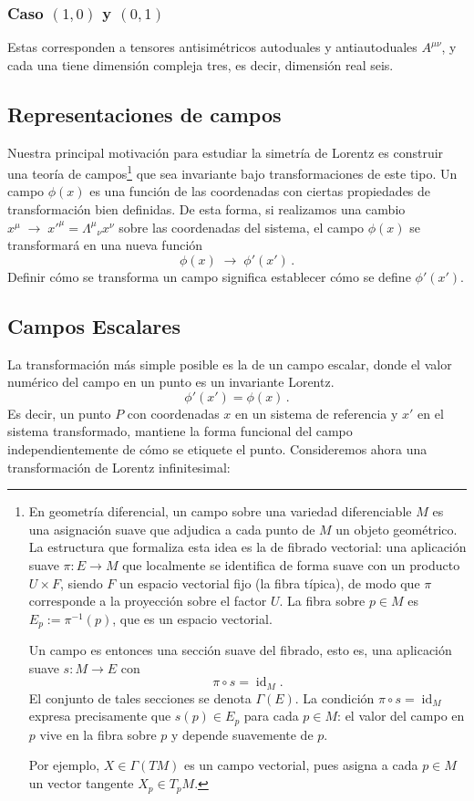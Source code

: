 \documentclass[a4paper,11pt]{book} %
\begin{document}
\subsubsection*{Caso $(1, 0)$ y $(0, 1)$}
\noindent
Estas corresponden a tensores antisimétricos
autoduales y antiautoduales $A^{\mu\nu}$, y cada una tiene dimensión compleja
tres, es decir, dimensión real seis.
\newpage
\subsection{Representaciones de campos}
\noindent
Nuestra principal motivación para estudiar la simetría de Lorentz es construir una teoría de campos\footnote{En geometría diferencial, un campo sobre una variedad
diferenciable \(M\) es una asignación suave que adjudica a cada punto de \(M\)
un objeto geométrico. La estructura que formaliza esta idea es la de
fibrado vectorial: una aplicación suave \(\pi:E\to M\) que localmente
se identifica de forma suave con un producto \(U\times F\), siendo \(F\) un
espacio vectorial fijo (la fibra típica), de modo que \(\pi\) corresponde a la
proyección sobre el factor \(U\). La fibra sobre \(p\in M\) es
\(E_p:=\pi^{-1}(p)\), que es un espacio vectorial.

Un campo es entonces una sección suave del fibrado, esto es, una
aplicación suave \(s:M\to E\) con
\[
\pi\circ s=\operatorname{id}_M .
\]
El conjunto de tales secciones se denota \(\Gamma(E)\). La condición
\(\pi\circ s=\operatorname{id}_M\) expresa precisamente que \(s(p)\in E_p\)
para cada \(p\in M\): el valor del campo en \(p\) vive en la fibra sobre \(p\)
y depende suavemente de \(p\).

Por ejemplo, \(X\in\Gamma(TM)\) es un campo vectorial, pues asigna a cada
\(p\in M\) un vector tangente \(X_p\in T_pM\).} que sea invariante bajo transformaciones de este tipo. Un campo $\phi(x)$ es una función de
las coordenadas con ciertas propiedades de transformación bien definidas.
\medskip\newline
De esta forma, si realizamos una cambio $
x^{\mu}\;\rightarrow\;x'^{\mu}=\Lambda^{\mu}{}_{\nu}x^{\nu}$ sobre las coordenadas del sistema, el campo $\phi(x)$ se transformará en una nueva función 
\begin{equation}
\phi(x)\;\rightarrow\;\phi'(x')\,.
\end{equation}
 \noindent
Definir cómo se transforma un campo significa establecer cómo se define
$\phi'(x')$.
\subsection*{Campos Escalares}
\noindent
La transformación más simple posible es la de un campo escalar, donde el valor numérico del campo en un punto es un
invariante Lorentz.
\begin{equation}
\phi'(x')=\phi(x)\,.
\end{equation}
 \noindent
Es decir, un punto $P$ con coordenadas $x$ en un sistema de
referencia y $x'$ en el sistema transformado, mantiene la forma funcional del campo independientemente de
cómo se etiquete el punto.
\medskip\newline
Consideremos ahora una transformación de Lorentz infinitesimal:
\end{document}
